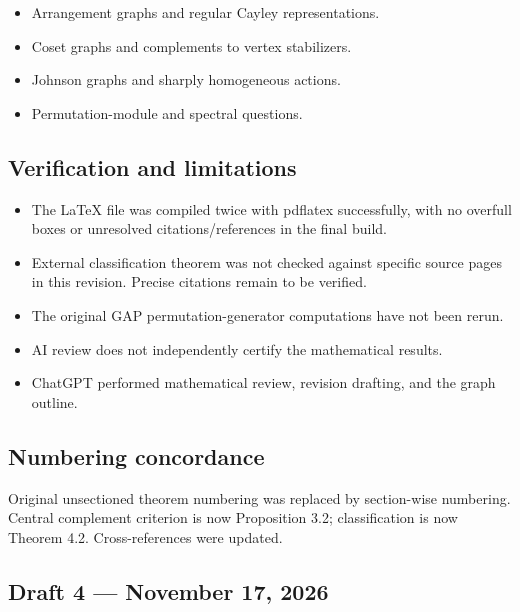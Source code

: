 \documentclass[12pt,letterpaper]{article}
\providecommand{\tightlist}{\setlength{\itemsep}{0pt}\setlength{\parskip}{0pt}}
\begin{document}
\begin{itemize}
\tightlist
\item
  Arrangement graphs and regular Cayley representations.
\item
  Coset graphs and complements to vertex stabilizers.
\item
  Johnson graphs and sharply homogeneous actions.
\item
  Permutation-module and spectral questions.
\end{itemize}

\hypertarget{verification-and-limitations}{%
\subsection*{Verification and
limitations}\label{verification-and-limitations}}

\begin{itemize}
\tightlist
\item
  The LaTeX file was compiled twice with pdflatex successfully, with no
  overfull boxes or unresolved citations/references in the final build.
\item
  External classification theorem was not checked against specific
  source pages in this revision. Precise citations remain to be
  verified.
\item
  The original GAP permutation-generator computations have not been
  rerun.
\item
  AI review does not independently certify the mathematical results.
\item
  ChatGPT performed mathematical review, revision drafting, and the
  graph outline.
\end{itemize}

\hypertarget{numbering-concordance}{%
\subsection*{Numbering concordance}\label{numbering-concordance}}

Original unsectioned theorem numbering was replaced by section-wise
numbering. Central complement criterion is now Proposition 3.2;
classification is now Theorem 4.2. Cross-references were updated.

\hypertarget{draft-4-november-17-2026}{%
\subsection*{Draft 4 --- November 17,
2026}\label{draft-4-november-17-2026}}
\end{document}
